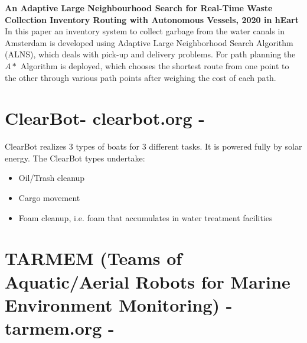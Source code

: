 \documentclass{article}
\begin{document}
\textbf{An Adaptive Large Neighbourhood Search for Real-Time Waste Collection Inventory Routing with Autonomous Vessels, 2020 in hEart}
\vspace{3pt}
\\
In this paper an inventory system to collect garbage from the water canals in Amsterdam is developed using Adaptive Large Neighborhood Search Algorithm (ALNS), which deals with pick-up and delivery problems. For path planning the $A*$ Algorithm is deployed, which chooses the shortest route from one point to the other through various path points after weighing the cost of each path. 


\section{ClearBot- clearbot.org -} 
ClearBot realizes 3 types of boats for 3 different tasks. It is powered fully by solar energy. The ClearBot types undertake: 
\begin{itemize}
	\item Oil/Trash cleanup
	\item Cargo movement
	\item Foam cleanup, i.e. foam that accumulates in water treatment facilities
\end{itemize}
	


\section{TARMEM (Teams of Aquatic/Aerial Robots for Marine Environment Monitoring) - tarmem.org -} 
\end{document}

